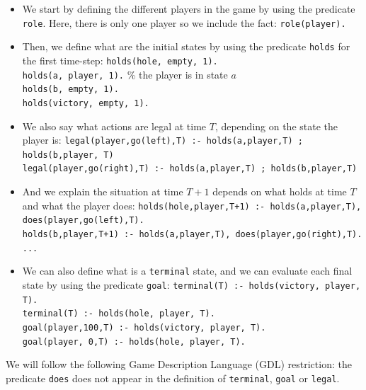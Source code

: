 \begin{itemize}



\item We start by defining the different players in the game by using the predicate \texttt{role}. Here, there is only one player so we include the fact: \texttt{role(player).}

\smallskip

\item Then, we define what are the initial states by using the predicate \texttt{holds} for the first time-step:\newline
\texttt{holds(hole, empty, 1).}\\
\texttt{holds(a, player, 1).} \% the player is in state $a$\\
\texttt{holds(b, empty, 1).}\\
\texttt{holds(victory, empty, 1).}

\item We also say what actions are legal at time $T$, depending on the state the player is:\newline
\texttt{legal(player,go(left),T) :- holds(a,player,T) ; holds(b,player, T)}\\
\texttt{legal(player,go(right),T) :- holds(a,player,T) ; holds(b,player,T)}

\item And we explain the situation at time $T+1$ depends on what holds at time $T$ and what the player does:\newline
\texttt{holds(hole,player,T+1) :- holds(a,player,T), does(player,go(left),T).}\\
\texttt{holds(b,player,T+1) :- holds(a,player,T), does(player,go(right),T).}\\
\texttt{...}

\item We can also define what is a \texttt{terminal} state, and we can evaluate each final state by using the predicate \texttt{goal}: \newline
\texttt{terminal(T) :- holds(victory, player, T).}\\
\texttt{terminal(T) :- holds(hole, player, T).}\\
\texttt{goal(player,100,T) :- holds(victory, player, T).}\\
\texttt{goal(player,  0,T) :- holds(hole, player, T).}
\end{itemize}

We will follow the following Game Description Language (GDL) restriction: the predicate \texttt{does} does not appear in the definition of \texttt{terminal}, \texttt{goal} or \texttt{legal}.

